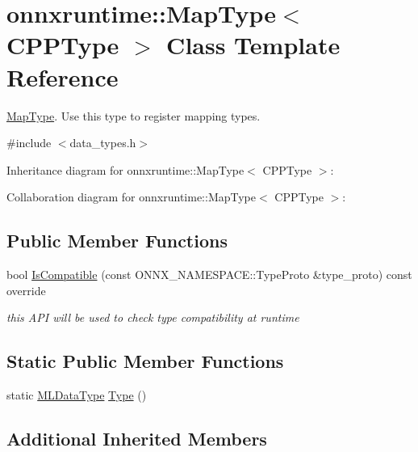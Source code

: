 \hypertarget{classonnxruntime_1_1MapType}{}\section{onnxruntime\+:\+:Map\+Type$<$ C\+P\+P\+Type $>$ Class Template Reference}
\label{classonnxruntime_1_1MapType}


\mbox{\hyperlink{classonnxruntime_1_1MapType}{Map\+Type}}. Use this type to register mapping types.  




{\ttfamily \#include $<$data\+\_\+types.\+h$>$}



Inheritance diagram for onnxruntime\+:\+:Map\+Type$<$ C\+P\+P\+Type $>$\+:


Collaboration diagram for onnxruntime\+:\+:Map\+Type$<$ C\+P\+P\+Type $>$\+:
\subsection*{Public Member Functions}
\begin{DoxyCompactItemize}
\item 
bool \mbox{\hyperlink{classonnxruntime_1_1MapType_a4f5bf9ba0f295628b585909bdeaea30c}{Is\+Compatible}} (const O\+N\+N\+X\+\_\+\+N\+A\+M\+E\+S\+P\+A\+C\+E\+::\+Type\+Proto \&type\+\_\+proto) const override
\begin{DoxyCompactList}\small\item\em this A\+PI will be used to check type compatibility at runtime \end{DoxyCompactList}\end{DoxyCompactItemize}
\subsection*{Static Public Member Functions}
\begin{DoxyCompactItemize}
\item 
static \mbox{\hyperlink{namespaceonnxruntime_ad77d0a6e838ec7da5dc35fed5ee66b49}{M\+L\+Data\+Type}} \mbox{\hyperlink{classonnxruntime_1_1MapType_a8c91299b175dfdadc41c2d732eecb3a3}{Type}} ()
\end{DoxyCompactItemize}
\subsection*{Additional Inherited Members}


